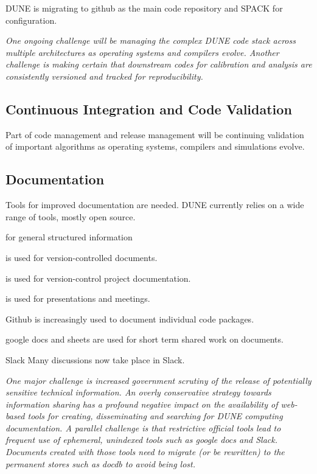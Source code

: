 \documentclass[../main-v1.tex]{subfiles}
\begin{document}
DUNE is migrating to github as the main code repository and SPACK for configuration.  

{\it One ongoing challenge will be managing the complex DUNE code stack across multiple architectures as operating systems and compilers evolve. Another challenge is making certain that downstream codes for calibration and analysis are consistently versioned and tracked for reproducibility.} 

\subsection{Continuous Integration and Code Validation}

Part of code management and release management will be continuing validation of important algorithms as operating systems, compilers and simulations evolve. 



\subsection{Documentation}
Tools for improved documentation are needed. DUNE currently relies on a wide range of tools, mostly open source.

\begin{description}
\item[Mediawiki] for general structured information
\item[docdb]  is used for version-controlled documents. 
\item[edms]  is used for version-control project documentation.
\item[indico]  is used for presentations and meetings. 
\item[github] Github is increasingly used to document individual code packages.
\item[google tools] google docs and sheets are used for short term shared work on documents.
\item{Slack}  Many discussions now take place in Slack.


\end{description}

{\it One major challenge is increased government  scrutiny of the release of potentially sensitive technical information.  An overly conservative strategy towards information sharing has a profound negative impact on the availability of web-based tools for creating, disseminating and searching for DUNE computing documentation. A parallel  challenge is that restrictive official tools lead to frequent use of ephemeral, unindexed tools such as google docs and Slack.  Documents created with those tools need to migrate (or be rewritten) to the permanent stores such as docdb to avoid being lost.  } 
\end{document}
